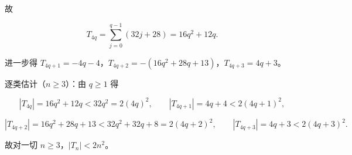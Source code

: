 \begin{answer}
故

\nopagebreak[4]
\[T_{4q}=\sum_{j=0}^{q-1}(32j+28)=16q^2+12q.\]

进一步得 $T_{4q+1}=-4q-4$，$T_{4q+2}=-(16q^2+28q+13)$，$T_{4q+3}=4q+3$。

逐类估计（$n\geqslant3$）：由 $q\geqslant1$ 得

\nopagebreak[4]
\[|T_{4q}|=16q^2+12q<32q^2=2(4q)^2,\qquad |T_{4q+1}|=4q+4<2(4q+1)^2,\]

\nopagebreak[4]
\[|T_{4q+2}|=16q^2+28q+13<32q^2+32q+8=2(4q+2)^2,\qquad |T_{4q+3}|=4q+3<2(4q+3)^2.\]

故对一切 $n\geqslant3$，$|T_n|<2n^2$。


\end{answer}